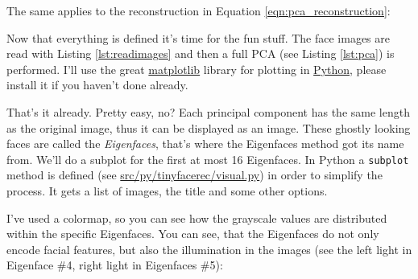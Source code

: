 The same applies to the reconstruction in Equation \ref{eqn:pca_reconstruction}: 
\ifx\python\undefined
	
\else
	
\fi

Now that everything is defined it's time for the fun stuff. The face images are read with Listing \ref{lst:readimages} and then a full PCA (see Listing \ref{lst:pca}) is performed. \ifx\python\ifx\python\undefined \else I'll use the great \href{http://matplotlib.sourceforge.net/}{matplotlib} library for plotting in \href{http://www.python.org}{Python}, please install it if you haven't done already.\fi

\ifx\python\undefined
	
\else
	
\fi

That's it already. Pretty easy, no? Each principal component has the same length as the original image, thus it can be displayed as an image. These ghostly looking faces are called the \textit{Eigenfaces}, that's where the Eigenfaces method got its name from. We'll do a subplot for the first at most 16 Eigenfaces. \ifx\python\undefined \else In Python a \lstinline|subplot| method is defined (see \url{src/py/tinyfacerec/visual.py}) in order to simplify the process. It gets a list of images, the title and some other options.\fi

\ifx\python\undefined
	
\else
	
\fi

I've used a colormap, so you can see how the grayscale values are distributed within the specific Eigenfaces. You can see, that the Eigenfaces do not only encode facial features, but also the illumination in the images (see the left light in Eigenface \#4, right light in Eigenfaces \#5):


